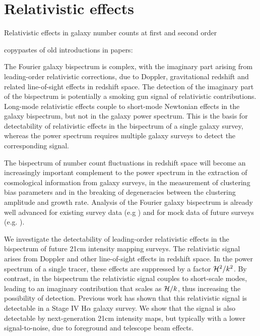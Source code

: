 
\chapter{Relativistic effects}
\label{chapter:introreleff}


Relativistic effects in galaxy number counts at first and second order

copypastes of old introductions in papers:

The Fourier galaxy bispectrum is complex, with the imaginary part arising from leading-order relativistic corrections, due to Doppler, gravitational redshift  and related line-of-sight effects  in redshift space. The detection of the imaginary  part of the bispectrum is potentially a smoking gun signal of relativistic contributions. Long-mode relativistic effects couple to  short-mode Newtonian effects in the galaxy bispectrum, but not in the galaxy power spectrum. This is  the basis for detectability of relativistic effects in the bispectrum of a single galaxy survey, whereas the power spectrum requires multiple galaxy surveys to detect the corresponding signal.

The bispectrum of number count fluctuations in redshift space will become an increasingly important complement to the power spectrum in the extraction of cosmological information from galaxy surveys, 
{in the measurement of {clustering} bias parameters and in the breaking of degeneracies between the clustering amplitude and growth rate.}
Analysis of the Fourier galaxy bispectrum is already well advanced for existing survey data (e.g \cite{Gil-Marin:2016wya,Sugiyama:2018yzo}) and for mock data of future surveys (e.g. \cite{Karagiannis:2018jdt,Yankelevich:2018uaz,Oddo:2019run,Sugiyama:2019ike}). 

We investigate the detectability of leading-order relativistic effects in the bispectrum of future 21cm intensity  mapping surveys. The relativistic signal arises from Doppler and other line-of-sight effects in redshift space. In the power spectrum of a single tracer, these effects are suppressed by a factor $\mathcal{H}^2/k^2$. By contrast, in the bispectrum the relativistic signal couples to short-scale modes, leading to
an imaginary contribution that scales as $\mathcal{H}/k$, thus increasing the possibility of detection.
Previous work has shown that this relativistic signal is detectable in a Stage IV H$\alpha$ galaxy survey. 
{We show that the signal is also detectable by next-generation  21cm intensity maps, but typically with a lower signal-to-noise, due to foreground and telescope beam effects.}


